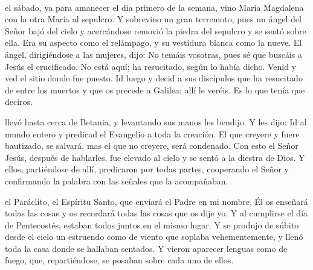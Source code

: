 \documentclass[10pt,twoside]{book}
\begin{document}
\noindent{}\\[4mm]
\vspace{2mm}
el sábado, ya para amanecer el día primero de la semana, vino María Magdalena con la otra María al sepulcro. Y sobrevino un gran terremoto,
pues un ángel del Señor bajó del cielo y acercándose removió la piedra del sepulcro y se sentó sobre ella. Era su aspecto como el relámpago, y su vestidura blanca como la nueve.
El ángel, dirigiéndose a las mujeres, dijo: No temáis vosotras, pues sé que buscáis a Jesús el crucificado. No está aquí; ha resucitado, según lo había dicho.
Venid y ved el sitio donde fue puesto. Id luego y decid a sus discípulos que ha resucitado de entre los muertos y que os precede a Galilea; allí le veréis.
Es lo que tenía que deciros.\\[-2mm]

\vspace{5mm}

\noindent{}
\vspace{2mm}
llevó hasta cerca de Betania, y levantando sus manos les bendijo. Y les dijo: Id al mundo entero y predicad el Evangelio a toda la creación.
El que creyere y fuere bautizado, se salvará, mas el que no creyere, será condenado. Con esto el Señor Jesús, después de hablarles, fue elevado al cielo y se sentó a la diestra de Dios.
Y ellos, partiéndose de allí, predicaron por todas partes, cooperando el Señor y confirmando la palabra con las señales que la acompañaban.\\[2mm]

\vspace{5mm}

\noindent{}
\vspace{2mm}
el Paráclito, el Espíritu Santo, que enviará el Padre en mi nombre, Él os enseñará todas las cosas y os recordará todas las cosas que os dije yo.
Y al cumplirse el día de Pentecostés, estaban todos juntos en el mismo lugar. Y se produjo de súbito desde el cielo un estruendo como de viento que soplaba vehementemente,
y llenó toda la casa donde se hallaban sentados. Y vieron aparecer lenguas como de fuego, que, repartiéndose, se posaban sobre cada uno de ellos.\\[2mm]

\vspace{5mm}
\end{document}
